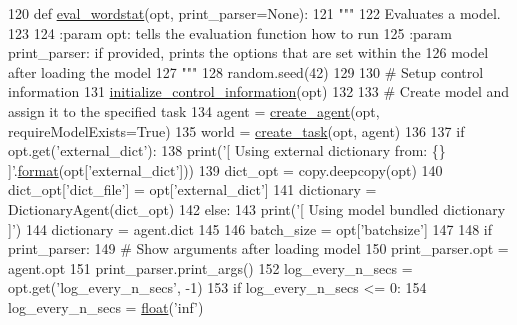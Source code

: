 \begin{DoxyCode}
120 \textcolor{keyword}{def }\hyperlink{namespaceprojects_1_1controllable__dialogue_1_1eval__wordstat_aa89fea1e83d255fa77e81e73a7d81161}{eval\_wordstat}(opt, print\_parser=None):
121     \textcolor{stringliteral}{"""}
122 \textcolor{stringliteral}{    Evaluates a model.}
123 \textcolor{stringliteral}{}
124 \textcolor{stringliteral}{    :param opt: tells the evaluation function how to run}
125 \textcolor{stringliteral}{    :param print\_parser: if provided, prints the options that are set within the}
126 \textcolor{stringliteral}{        model after loading the model}
127 \textcolor{stringliteral}{    """}
128     random.seed(42)
129 
130     \textcolor{comment}{# Setup control information}
131     \hyperlink{namespaceprojects_1_1controllable__dialogue_1_1controllable__seq2seq_1_1controls_aafbe257df1791349439cc63c99de8b5e}{initialize\_control\_information}(opt)
132 
133     \textcolor{comment}{# Create model and assign it to the specified task}
134     agent = \hyperlink{namespaceparlai_1_1core_1_1agents_a00d77a7e26fb89e8bd900f7b2a02982a}{create\_agent}(opt, requireModelExists=\textcolor{keyword}{True})
135     world = \hyperlink{namespaceparlai_1_1core_1_1worlds_a79969c7ba76d4b3c500f5bb776444dc6}{create\_task}(opt, agent)
136 
137     \textcolor{keywordflow}{if} opt.get(\textcolor{stringliteral}{'external\_dict'}):
138         print(\textcolor{stringliteral}{'[ Using external dictionary from: \{\} ]'}.\hyperlink{namespaceparlai_1_1chat__service_1_1services_1_1messenger_1_1shared__utils_a32e2e2022b824fbaf80c747160b52a76}{format}(opt[\textcolor{stringliteral}{'external\_dict'}]))
139         dict\_opt = copy.deepcopy(opt)
140         dict\_opt[\textcolor{stringliteral}{'dict\_file'}] = opt[\textcolor{stringliteral}{'external\_dict'}]
141         dictionary = DictionaryAgent(dict\_opt)
142     \textcolor{keywordflow}{else}:
143         print(\textcolor{stringliteral}{'[ Using model bundled dictionary ]'})
144         dictionary = agent.dict
145 
146     batch\_size = opt[\textcolor{stringliteral}{'batchsize'}]
147 
148     \textcolor{keywordflow}{if} print\_parser:
149         \textcolor{comment}{# Show arguments after loading model}
150         print\_parser.opt = agent.opt
151         print\_parser.print\_args()
152     log\_every\_n\_secs = opt.get(\textcolor{stringliteral}{'log\_every\_n\_secs'}, -1)
153     \textcolor{keywordflow}{if} log\_every\_n\_secs <= 0:
154         log\_every\_n\_secs = \hyperlink{namespaceprojects_1_1controllable__dialogue_1_1make__control__dataset_aa2b7207688c641dbc094ab44eca27113}{float}(\textcolor{stringliteral}{'inf'})

\end{DoxyCode}
